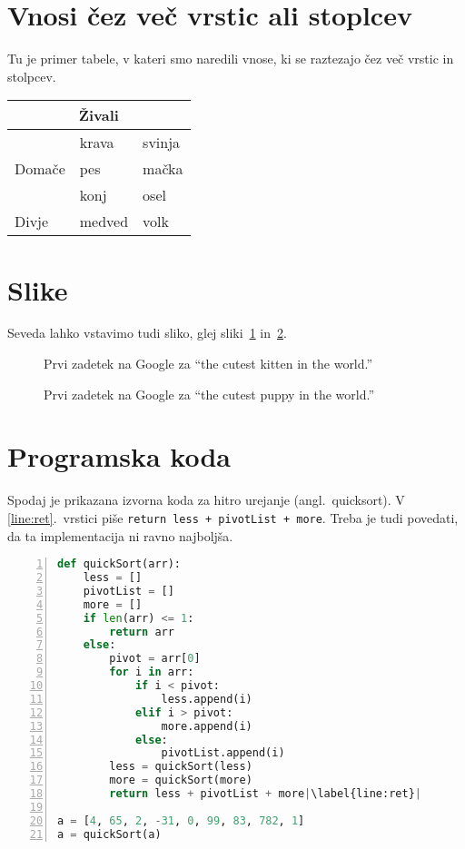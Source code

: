 \documentclass{article}
\begin{document}
\section{Vnosi čez več vrstic ali stoplcev}
\label{sec:vnosi-ez-ve}

Tu je primer tabele, v kateri smo naredili vnose, ki se raztezajo čez več vrstic in stolpcev.

\begin{center}
\begin{tabular}{lll}
  \toprule
  \multicolumn{3}{c}{Živali} \\ \midrule
  \multirow{3}{*}{Domače} & krava & svinja \\
                          & pes & mačka \\
                          & konj & osel \\
  Divje                   & medved & volk \\ \bottomrule
\end{tabular}
\end{center}

\section{Slike}
\label{sec:slike}

Seveda lahko vstavimo tudi sliko, glej sliki~\ref{fig:muca} in~\ref{fig:kuza}.

\begin{figure}
  \centering
  \caption{Prvi zadetek na Google za ``the cutest kitten in the world.''}
  \label{fig:muca}
\end{figure}

\begin{figure}[ht]
  \centering
  \caption{Prvi zadetek na Google za ``the cutest puppy in the world.''}
  \label{fig:kuza}
\end{figure}


\section{Programska koda}
\label{sec:programska-koda}


Spodaj je prikazana izvorna koda za hitro urejanje (angl.\ quicksort).
V \ref{line:ret}.\ vrstici piše \lstinline|return less + pivotList + more|.
Treba je tudi povedati, da ta implementacija ni ravno najboljša.

\begin{lstlisting}[language=Python,numbers=left,escapechar=|]
def quickSort(arr):
    less = []
    pivotList = []
    more = []
    if len(arr) <= 1:
        return arr
    else:
        pivot = arr[0]
        for i in arr:
            if i < pivot:
                less.append(i)
            elif i > pivot:
                more.append(i)
            else:
                pivotList.append(i)
        less = quickSort(less)
        more = quickSort(more)
        return less + pivotList + more|\label{line:ret}|
 
a = [4, 65, 2, -31, 0, 99, 83, 782, 1]
a = quickSort(a)
\end{lstlisting}
\end{document}

